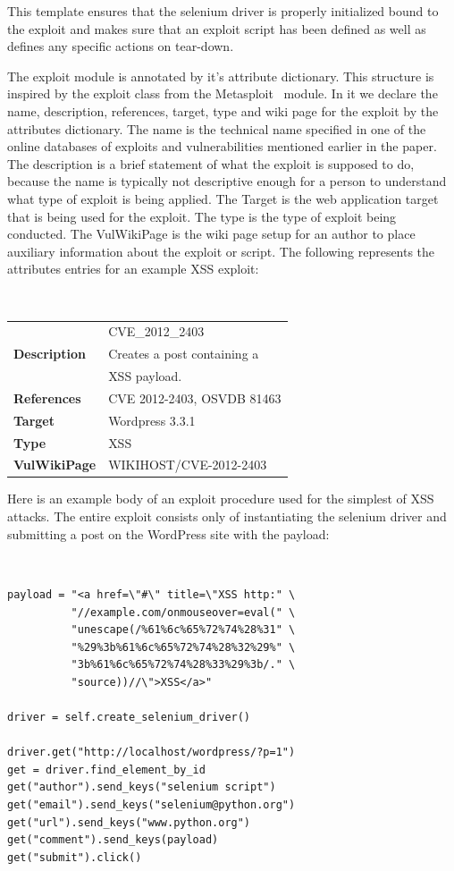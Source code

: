 \documentclass[letterpaper,twocolumn,10pt]{article}
\begin{document}
This template ensures that the selenium driver is properly initialized bound to the exploit and makes sure that an exploit script has been defined as well as defines any specific actions on tear-down.\par

The exploit module is annotated by it's attribute dictionary. This structure is inspired by the exploit class from the Metasploit~\cite{MetaSploit:2012:Online} module. In it we declare the name, description, references, target, type and wiki page for the exploit by the attributes dictionary.  The name is the technical name specified in one of the online databases of exploits and vulnerabilities mentioned earlier in the paper.  The description is a brief statement of what the exploit is supposed to do, because the name is typically not descriptive enough for a person to understand what type of exploit is being applied.  The Target is the web application target that is being used for the exploit.  The type is the type of exploit being conducted.  The VulWikiPage is the wiki page setup for an author to place auxiliary information about the exploit or script.  The following represents the attributes entries for an example XSS exploit:\\


{\tt \small
\begin{tabular} { l l }
\noindent{\bf Name}&CVE\_2012\_2403\\
{\bf Description}&Creates a post containing a\\& XSS payload.\\
{\bf References}&CVE 2012-2403, OSVDB 81463 \\
{\bf Target}&Wordpress 3.3.1\\
{\bf Type}&XSS\\
{\bf VulWikiPage}&WIKIHOST/CVE-2012-2403
\end{tabular}
}

Here is an example body of an exploit procedure used for the simplest of XSS attacks.  The entire exploit consists only of instantiating the selenium driver and submitting a post on the WordPress site with the payload: 

\begin{minipage}{\textwidth}
{\tt \footnotesize
\begin{lstlisting}
payload = "<a href=\"#\" title=\"XSS http:" \
          "//example.com/onmouseover=eval(" \
          "unescape(/%61%6c%65%72%74%28%31" \
          "%29%3b%61%6c%65%72%74%28%32%29%" \
          "3b%61%6c%65%72%74%28%33%29%3b/." \
          "source))//\">XSS</a>"

driver = self.create_selenium_driver()

driver.get("http://localhost/wordpress/?p=1")
get = driver.find_element_by_id
get("author").send_keys("selenium script")
get("email").send_keys("selenium@python.org")
get("url").send_keys("www.python.org")
get("comment").send_keys(payload)
get("submit").click()
\end{lstlisting}
}
\end{minipage}
\end{document}
